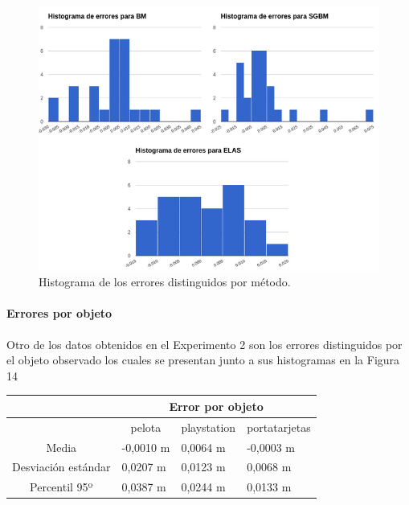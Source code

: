 \documentclass[11pt,a4paper,titlepage]{article}
\newcommand{\Figure}[1]{Figura #1}
\begin{document}
\begin{figure}[h!]

  \centering
    \includegraphics[width=1\textwidth]{f12.png}
  \caption{Histograma de los errores distinguidos por método.}
\end{figure}

\paragraph{Errores por objeto}
\hfill \break

Otro de los datos obtenidos en el Experimento 2 son los errores distinguidos por el objeto observado los cuales se presentan junto a sus histogramas en la \Figure{14}

\begin{table}[!ht]
\centering
\begin{tabular}{@{}clll@{}}
& \multicolumn{3}{c}{Error por objeto} \\ \midrule
       & \multicolumn{1}{c}{pelota} & \multicolumn{1}{c}{playstation} & \multicolumn{1}{c}{portatarjetas} \\ \midrule
Media & -0,0010 m & 0,0064 m & -0,0003 m \\ \midrule
Desviación estándar & 0,0207 m & 0,0123 m & 0,0068 m \\ \midrule
Percentil 95º & 0,0387 m & 0,0244 m & 0,0133 m \\ \midrule
\end{tabular}
\end{table}
\end{document}
